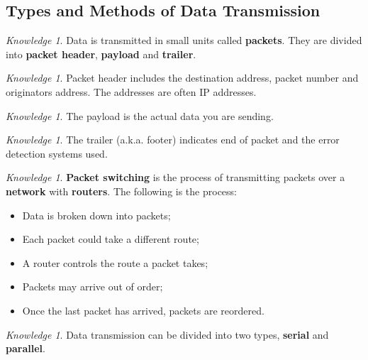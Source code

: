 \documentclass[8pt]{article}
\theoremstyle{remark}
\newtheorem{knowledge}[method]{Knowledge}
\begin{document}
        \subsection{Types and Methods of Data Transmission}    

        \begin{knowledge}
            Data is transmitted in small units called \textbf{packets}. They are divided into \textbf{packet header}, \textbf{payload} and \textbf{trailer}.
        \end{knowledge}
        
        \begin{knowledge}
            Packet header includes the destination address, packet number and originators address. The addresses are often IP addresses.
        \end{knowledge}

        \begin{knowledge}
            The payload is the actual data you are sending.
        \end{knowledge}

        \begin{knowledge}
            The trailer (a.k.a. footer) indicates end of packet and the error detection systems used.
        \end{knowledge}

        \begin{knowledge}
            \textbf{Packet switching} is the process of transmitting packets over a \textbf{network} with \textbf{routers}. The following is the process:
            \begin{itemize}
                \item Data is broken down into packets;
                \item Each packet could take a different route;
                \item A router controls the route a packet takes;
                \item Packets may arrive out of order;
                \item Once the last packet has arrived, packets are reordered.
            \end{itemize}
        \end{knowledge}

        \begin{knowledge}
            Data transmission can be divided into two types, \textbf{serial} and \textbf{parallel}.
        \end{knowledge}
\end{document}
